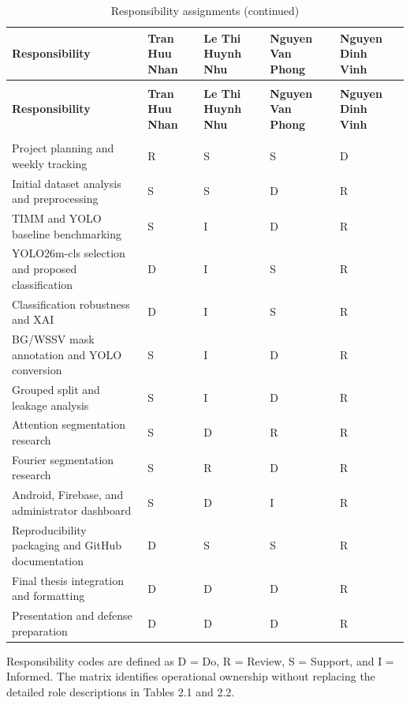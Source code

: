 \begingroup
\CVioTableSetup
\scriptsize
\begin{longtable}{|>{\centering\arraybackslash}p{3.06cm}|>{\centering\arraybackslash}p{1.77cm}|>{\centering\arraybackslash}p{1.77cm}|>{\centering\arraybackslash}p{1.77cm}|>{\centering\arraybackslash}p{1.77cm}|}
\caption{Responsibility assignments}\\
\hline
\rowcolor{cvioPeach}\textbf{Responsibility} & \textbf{Tran Huu Nhan} & \textbf{Le Thi Huynh Nhu} & \textbf{Nguyen Van Phong} & \textbf{Nguyen Dinh Vinh} \\ \hline
\endfirsthead
\caption[]{Responsibility assignments (continued)}\\
\hline
\rowcolor{cvioPeach}\textbf{Responsibility} & \textbf{Tran Huu Nhan} & \textbf{Le Thi Huynh Nhu} & \textbf{Nguyen Van Phong} & \textbf{Nguyen Dinh Vinh} \\ \hline
\endhead
\hline
\multicolumn{5}{r}{\footnotesize Continued on next page}\\
\endfoot
\hline
\endlastfoot
Project planning and weekly tracking & R & S & S & D \\ \hline
Initial dataset analysis and preprocessing & S & S & D & R \\ \hline
TIMM and YOLO baseline benchmarking & S & I & D & R \\ \hline
YOLO26m-cls selection and proposed classification & D & I & S & R \\ \hline
Classification robustness and XAI & D & I & S & R \\ \hline
BG/WSSV mask annotation and YOLO conversion & S & I & D & R \\ \hline
Grouped split and leakage analysis & S & I & D & R \\ \hline
Attention segmentation research & S & D & R & R \\ \hline
Fourier segmentation research & S & R & D & R \\ \hline
Android, Firebase, and administrator dashboard & S & D & I & R \\ \hline
Reproducibility packaging and GitHub documentation & D & S & S & R \\ \hline
Final thesis integration and formatting & D & D & D & R \\ \hline
Presentation and defense preparation & D & D & D & R \\ \hline
\end{longtable}
\endgroup
Responsibility codes are defined as D = Do, R = Review, S = Support, and I = Informed. The matrix identifies operational ownership without replacing the detailed role descriptions in Tables 2.1 and 2.2.\par
